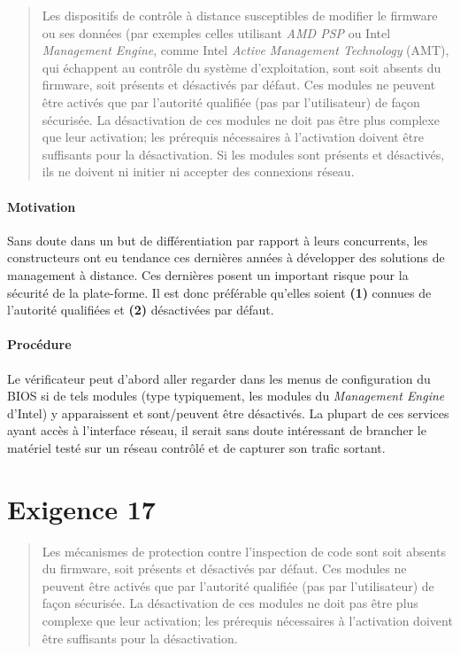 \documentclass{report}
\begin{document}
\begin{quote}
  Les dispositifs de contrôle à distance susceptibles de modifier le firmware ou
  ses données (par exemples celles utilisant \emph{AMD PSP} ou Intel
  \emph{Management Engine}, comme Intel \emph{Active Management Technology}
  (AMT), qui échappent au contrôle du système d’exploitation, sont soit absents
  du firmware, soit présents et désactivés par défaut.
  Ces modules ne peuvent être activés que par l’autorité qualifiée (pas par
  l’utilisateur) de façon sécurisée.
  La désactivation de ces modules ne doit pas être plus complexe que leur
  activation; les prérequis nécessaires à l’activation doivent être suffisants
  pour la désactivation.
  Si les modules sont présents et désactivés, ils ne doivent ni initier ni
  accepter des connexions réseau.
\end{quote}

\paragraph{Motivation}
%
Sans doute dans un but de différentiation par rapport à leurs concurrents, les
constructeurs ont eu tendance ces dernières années à développer des solutions de
management à distance.
%
Ces dernières posent un important risque pour la sécurité de la plate-forme.
%
Il est donc préférable qu’elles soient \textbf{(1)} connues de l’autorité
qualifiées et \textbf{(2)} désactivées par défaut.

\paragraph{Procédure}
%
Le vérificateur peut d’abord aller regarder dans les menus de configuration du
BIOS si de tels modules (type typiquement, les modules du \emph{Management
  Engine} d’Intel) y apparaissent et sont/peuvent être désactivés.
%
La plupart de ces services ayant accès à l’interface réseau, il serait sans
doute intéressant de brancher le matériel testé sur un réseau contrôlé et de
capturer son trafic sortant.

\section{Exigence 17}

\begin{quote}
  Les mécanismes de protection contre l’inspection de code sont soit absents du
  firmware, soit présents et désactivés par défaut.
  Ces modules ne peuvent être activés que par l’autorité qualifiée (pas par
  l’utilisateur) de façon sécurisée.
  La désactivation de ces modules ne doit pas être plus complexe que leur
  activation; les prérequis nécessaires à l’activation doivent être suffisants
  pour la désactivation.
\end{quote}
\end{document}
